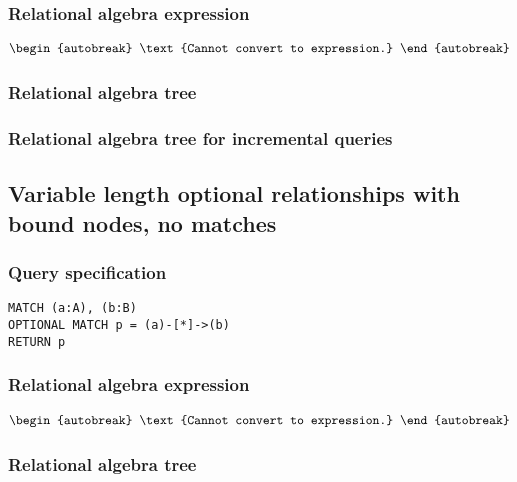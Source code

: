 \subsubsection*{Relational algebra expression}

\begin{align*}
\begin{autobreak}
\text{Cannot convert to expression.}
\end{autobreak}
\end{align*}

\subsubsection*{Relational algebra tree}


\subsubsection*{Relational algebra tree for incremental queries}


\subsection{Variable length optional relationships with bound nodes, no matches}

\subsubsection*{Query specification}

\begin{lstlisting}
MATCH (a:A), (b:B)
OPTIONAL MATCH p = (a)-[*]->(b)
RETURN p
\end{lstlisting}

\subsubsection*{Relational algebra expression}

\begin{align*}
\begin{autobreak}
\text{Cannot convert to expression.}
\end{autobreak}
\end{align*}

\subsubsection*{Relational algebra tree}

